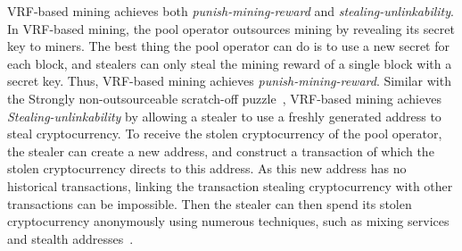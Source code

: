 VRF-based mining achieves both \emph{punish-mining-reward} and \emph{stealing-unlinkability}.
In VRF-based mining, the pool operator outsources mining by revealing its secret key to miners.
The best thing the pool operator can do is to use a new secret for each block, and stealers can only steal the mining reward of a single block with a secret key.
Thus, VRF-based mining achieves \emph{punish-mining-reward}.
Similar with the Strongly non-outsourceable scratch-off puzzle~\cite{miller2015nonoutsourceable}, VRF-based mining achieves \emph{Stealing-unlinkability} by allowing a stealer to use a freshly generated address to steal cryptocurrency.
To receive the stolen cryptocurrency of the pool operator, the stealer can create a new address, and construct a transaction of which the stolen cryptocurrency directs to this address.
As this new address has no historical transactions, linking the transaction stealing cryptocurrency with other transactions can be impossible.
Then the stealer can then spend its stolen cryptocurrency anonymously using numerous techniques, such as mixing services~\cite{maxwell2013coinjoin}\cite{bonneau2014mixcoin}\cite{ruffing2014coinshuffle}\cite{heilman2017tumblebit} and stealth addresses~\cite{van2013cryptonote}.


